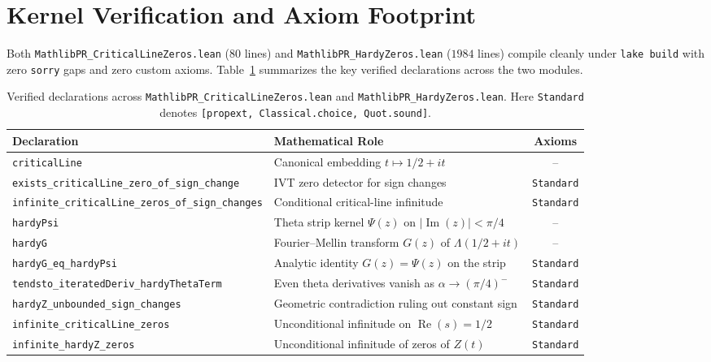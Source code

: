\documentclass[11pt,a4paper]{article}
\theoremstyle{definition}
\begin{document}
\section{Kernel Verification and Axiom Footprint}\label{sec:verification}

Both \texttt{MathlibPR\_\allowbreak CriticalLineZeros.lean} ($80$ lines) and \texttt{MathlibPR\_\allowbreak HardyZeros.lean} ($1984$ lines) compile cleanly under \texttt{lake build} with zero \texttt{sorry} gaps and zero custom axioms. Table~\ref{tab:hardy_declarations} summarizes the key verified declarations across the two modules.

\begin{table}[h!]
\centering
\footnotesize
\begin{tabular}{>{\raggedright\arraybackslash}p{6.2cm}p{6.0cm}c}
\toprule
\textbf{Declaration} & \textbf{Mathematical Role} & \textbf{Axioms} \\
\midrule
\texttt{criticalLine} & Canonical embedding $t \mapsto 1/2 + it$ & -- \\
\texttt{exists\_\allowbreak criticalLine\_\allowbreak zero\_\allowbreak of\_\allowbreak sign\_\allowbreak change} & IVT zero detector for sign changes & \texttt{Standard} \\
\texttt{infinite\_\allowbreak criticalLine\_\allowbreak zeros\_\allowbreak of\_\allowbreak sign\_\allowbreak changes} & Conditional critical-line infinitude & \texttt{Standard} \\
\texttt{hardyPsi} & Theta strip kernel $\Psi(z)$ on $|\operatorname{Im}(z)|<\pi/4$ & -- \\
\texttt{hardyG} & Fourier--Mellin transform $G(z)$ of $\Lambda(1/2+it)$ & -- \\
\texttt{hardyG\_\allowbreak eq\_\allowbreak hardyPsi} & Analytic identity $G(z) = \Psi(z)$ on the strip & \texttt{Standard} \\
\texttt{tendsto\_\allowbreak iteratedDeriv\_\allowbreak hardyThetaTerm} & Even theta derivatives vanish as $\alpha \to (\pi/4)^-$ & \texttt{Standard} \\
\texttt{hardyZ\_\allowbreak unbounded\_\allowbreak sign\_\allowbreak changes} & Geometric contradiction ruling out constant sign & \texttt{Standard} \\
\texttt{infinite\_\allowbreak criticalLine\_\allowbreak zeros} & Unconditional infinitude on $\operatorname{Re}(s)=1/2$ & \texttt{Standard} \\
\texttt{infinite\_\allowbreak hardyZ\_\allowbreak zeros} & Unconditional infinitude of zeros of $Z(t)$ & \texttt{Standard} \\
\bottomrule
\end{tabular}
\caption{Verified declarations across \texttt{MathlibPR\_CriticalLineZeros.lean} and \texttt{MathlibPR\_HardyZeros.lean}. Here \texttt{Standard} denotes \texttt{[propext, Classical.choice, Quot.sound]}.}
\label{tab:hardy_declarations}
\end{table}
\end{document}

